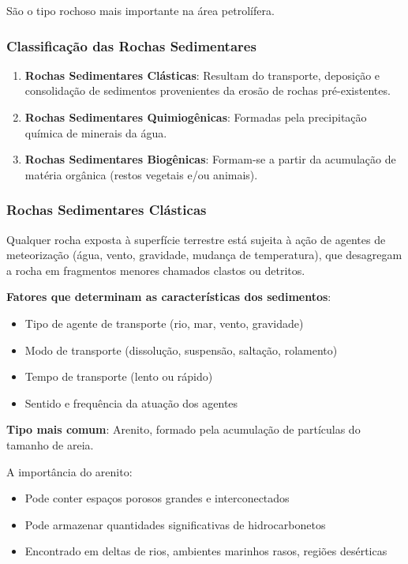 \documentclass[12pt,a4paper,twoside]{book}
\begin{document}
São o tipo rochoso mais importante na área petrolífera.

\subsubsection{Classificação das Rochas Sedimentares}

\begin{enumerate}
    \item \textbf{Rochas Sedimentares Clásticas}: Resultam do transporte, deposição e consolidação 
    de sedimentos provenientes da erosão de rochas pré-existentes.
    
    \item \textbf{Rochas Sedimentares Quimiogênicas}: Formadas pela precipitação química de minerais 
    da água.
    
    \item \textbf{Rochas Sedimentares Biogênicas}: Formam-se a partir da acumulação de matéria orgânica 
    (restos vegetais e/ou animais).
\end{enumerate}

\subsubsection{Rochas Sedimentares Clásticas}

Qualquer rocha exposta à superfície terrestre está sujeita à ação de agentes de meteorização 
(água, vento, gravidade, mudança de temperatura), que desagregam a rocha em fragmentos menores 
chamados clastos ou detritos.

\textbf{Fatores que determinam as características dos sedimentos}:
\begin{itemize}
    \item Tipo de agente de transporte (rio, mar, vento, gravidade)
    \item Modo de transporte (dissolução, suspensão, saltação, rolamento)
    \item Tempo de transporte (lento ou rápido)
    \item Sentido e frequência da atuação dos agentes
\end{itemize}

\textbf{Tipo mais comum}: Arenito, formado pela acumulação de partículas do tamanho de areia.

A importância do arenito:
\begin{itemize}
    \item Pode conter espaços porosos grandes e interconectados
    \item Pode armazenar quantidades significativas de hidrocarbonetos
    \item Encontrado em deltas de rios, ambientes marinhos rasos, regiões desérticas
\end{itemize}
\end{document}

